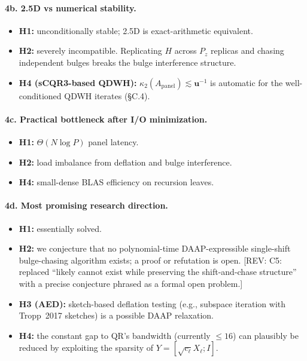 \documentclass[11pt]{article}
\newcommand{\REV}[1]{\textcolor{blue!60!black}{\small\textsf{[REV: #1]}}}
\begin{document}
\paragraph{4b. 2.5D vs numerical stability.}
\begin{itemize}[leftmargin=2em]
  \item \textbf{H1:} unconditionally stable; 2.5D is exact-arithmetic
    equivalent.
  \item \textbf{H2:} severely incompatible. Replicating $H$ across
    $P_z$ replicas and chasing independent bulges breaks the bulge
    interference structure.
  \item \textbf{H4 (sCQR3-based QDWH):} $\kappa_2(A_{\mathrm{panel}})
    \lesssim \mathbf{u}^{-1}$ is automatic for the well-conditioned
    QDWH iterates (\S C.4).
\end{itemize}

\paragraph{4c. Practical bottleneck after I/O minimization.}
\begin{itemize}[leftmargin=2em]
  \item \textbf{H1:} $\Theta(N\log P)$ panel latency.
  \item \textbf{H2:} load imbalance from deflation and bulge
    interference.
  \item \textbf{H4:} small-dense BLAS efficiency on recursion leaves.
\end{itemize}

\paragraph{4d. Most promising research direction.}
\label{sec:B4d}
\begin{itemize}[leftmargin=2em]
  \item \textbf{H1:} essentially solved.
  \item \textbf{H2:} we conjecture that no polynomial-time
    DAAP-expressible single-shift bulge-chasing algorithm exists; a
    proof or refutation is open. \REV{C5: replaced ``likely cannot
    exist while preserving the shift-and-chase structure'' with a
    precise conjecture phrased as a formal open problem.}
  \item \textbf{H3 (AED):} sketch-based deflation testing
    (e.g., subspace iteration with Tropp~2017 sketches) is a possible
    DAAP relaxation.
  \item \textbf{H4:} the constant gap to QR's bandwidth (currently
    $\le 16$) can plausibly be reduced by exploiting the sparsity of
    $Y = [\sqrt{c_\ell} X_\ell; I]$.
\end{itemize}
\end{document}
